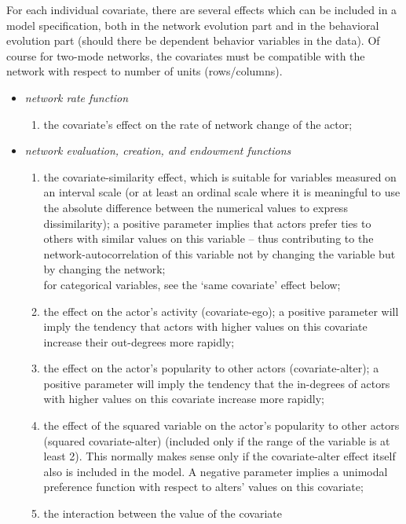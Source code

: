 \documentclass[a4paper,fleqn,11pt]{article}
\newcommand{\+}{\, + \,}
\begin{document}
For each individual covariate, there are several effects which
can be included in a model specification, both in the network
evolution part and in the behavioral evolution part (should there be
dependent behavior variables in the data).
Of course for two-mode networks, the covariates must be compatible
with the network with respect to number of units (rows/columns).
\begin{itemize}
\item {\em network rate function}
\begin{enumerate}
\item the covariate's effect on the rate of network change of the
actor;
\end{enumerate}
\item {\em network evaluation, creation, and endowment functions}
\begin{enumerate}
\item the covariate-similarity effect, which is suitable for variables
      measured on an interval scale (or at least an ordinal scale
      where it is meaningful to use the absolute difference
      between the numerical values to express dissimilarity);
      a positive parameter implies that actors prefer
      ties to others with similar values on this variable --
      thus contributing to the
      network-autocorrelation of this variable not by changing
      the variable but by changing the network;\\
      for categorical variables, see the `same covariate'
      effect below;
\item the effect on the actor's activity (covariate-ego);
      a positive parameter will imply the tendency that
      actors with higher values on this covariate
      increase their out-degrees more rapidly;
\item the effect on the actor's popularity to other actors (covariate-alter);
      a positive parameter will imply the tendency that
      the in-degrees of actors with higher values on this covariate
      increase more rapidly;
\item the effect of the squared variable
      on the actor's popularity to other actors (squared covariate-alter)
      (included only if the range of the variable is at least 2).
      This normally makes sense only if the covariate-alter effect
      itself also is included in the model.
      A negative parameter implies a unimodal preference
      function with respect to alters' values on this covariate;
\item the interaction between the value of the covariate

\end{enumerate}
\end{itemize}
\end{document}
